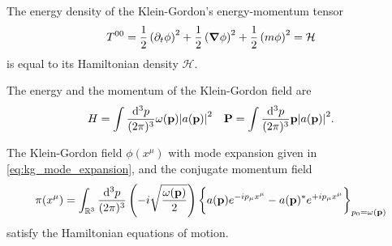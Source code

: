 \begin{lemma}\label{thm:kg_energy_density}
	The energy density of the Klein-Gordon's energy-momentum tensor
	\begin{equation}
		T^{00}
		=
		\frac{1}{2}
		\left(\partial_t\phi\right)^2
		+
		\frac{1}{2}
		\left(\grad\phi\right)^2
		+
		\frac{1}{2}
		\left(m\phi\right)^2
		=
		\mathcal{H}
		\label{thm:kg_hamiltonian}
	\end{equation}
	is equal to its Hamiltonian density $\mathcal{H}$.
\end{lemma}
\begin{lemma}\label{thm:kg_energy_momentum}
	The energy and the momentum of the Klein-Gordon field are
	\begin{align}
		H
		=
		\int\frac{\dd[3]{p}}{(2\pi)^3}
		\omega(\vb{p})\abs{a(\vb{p})}^2
		&&
		\vb{P}
		=
		\int\frac{\dd[3]{p}}{(2\pi)^3}
		\vb{p}\abs{a(\vb{p})}^2
		\label{eq:kg_energy_momentum}
		.
	\end{align}
\end{lemma}
\begin{lemma}\label{thm:kg_conjugate_momentum}
	The Klein-Gordon field $\phi(x^\mu)$ with mode expansion given in \cref{eq:kg_mode_expansion}, and the conjugate momentum field
	\begin{equation}
		\pi(x^\mu)
		=
		\int_{\mathbb{R}^3}\frac{\dd[3]{p}}{(2\pi)^3}
		\left(
			-i
			\sqrt{\frac{\omega(\vb{p})}{2}}
		\right)
		\biggl\{
			a(\vb{p})
			e^{-ip_\mu x^\mu}
			-
			a(\vb{p})^*
			e^{+ip_\mu x^\mu}
		\biggr\}_{p_0=\omega(\vb{p})}
		\label{eq:kg_conjugate_momentum}
	\end{equation}
	satisfy the Hamiltonian equations of motion.
\end{lemma}